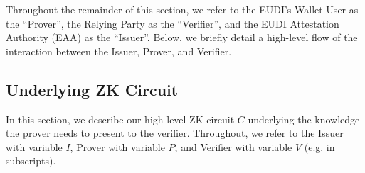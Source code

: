 Throughout the remainder of this section, we refer to the EUDI's Wallet User as the ``Prover'', the Relying Party as the ``Verifier'', and the EUDI Attestation Authority (EAA) as the ``Issuer''. Below, we briefly detail a high-level flow of the interaction between the Issuer, Prover, and Verifier.



\subsection{Underlying ZK Circuit}

In this section, we describe our high-level ZK circuit $C$ underlying the knowledge the prover needs to present to the verifier.
Throughout, we refer to the Issuer with variable $I$, Prover with variable $P$, and Verifier with variable $V$ (e.g. in subscripts). 

